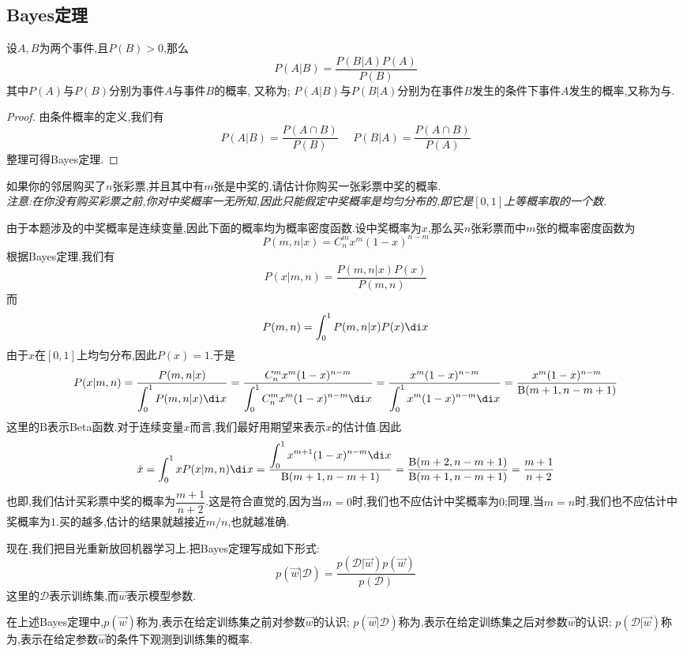 \documentclass{ctexart}
\begin{document}
\subsection{Bayes定理}
\begin{theorem}[Bayes定理]
    设$A,B$为两个事件,且$P(B)>0$,那么
    \[P(A|B)=\dfrac{P(B|A)P(A)}{P(B)}\]
    其中$P(A)$与$P(B)$分别为事件$A$与事件$B$的概率, 又称为; $P(A|B)$与$P(B|A)$分别为在事件$B$发生的条件下事件$A$发生的概率,又称为与.
\end{theorem}
\begin{proof}
    由条件概率的定义,我们有
    \[P(A|B)=\dfrac{P(A\cap B)}{P(B)}\ \ \ \ \ \ P(B|A)=\dfrac{P(A\cap B)}{P(A)}\]
    整理可得Bayes定理.
\end{proof}
\begin{problem}
    如果你的邻居购买了$n$张彩票,并且其中有$m$张是中奖的,请估计你购买一张彩票中奖的概率.\\
    \textit{注意:在你没有购买彩票之前,你对中奖概率一无所知,因此只能假定中奖概率是均匀分布的,即它是$[0,1]$上等概率取的一个数.}
\end{problem}
\begin{solution}
    由于本题涉及的中奖概率是连续变量,因此下面的概率均为概率密度函数.设中奖概率为$x$,那么买$n$张彩票而中$m$张的概率密度函数为
    \[P(m,n|x)=C_n^mx^m(1-x)^{n-m}\]
    根据Bayes定理,我们有
    \[P(x|m,n)=\dfrac{P(m,n|x)P(x)}{P(m,n)}\]
    而
    \[P(m,n)=\int_{0}^{1}P(m,n|x)P(x)\di x\]
    由于$x$在$[0,1]$上均匀分布,因此$P(x)=1$.于是
    \[P(x|m,n)=\dfrac{P(m,n|x)}{\displaystyle\int_0^1P(m,n|x)\di x}=\dfrac{C_n^mx^m(1-x)^{n-m}}{\displaystyle\int_0^1C_n^mx^m(1-x)^{n-m}\di x}=\dfrac{x^m(1-x)^{n-m}}{\displaystyle\int_0^1x^m(1-x)^{n-m}\di x}
    =\dfrac{x^m(1-x)^{n-m}}{\text{B}(m+1,n-m+1)}\]
    这里的$\text{B}$表示Beta函数.对于连续变量$x$而言,我们最好用期望来表示$x$的估计值.因此
    \[\hat{x}=\int_0^1xP(x|m,n)\di x=\dfrac{\displaystyle\int_0^1x^{m+1}(1-x)^{n-m}\di x}{\text{B}(m+1,n-m+1)}=\dfrac{\text{B}(m+2,n-m+1)}{\text{B}(m+1,n-m+1)}=\dfrac{m+1}{n+2}\]
    也即,我们估计买彩票中奖的概率为$\dfrac{m+1}{n+2}$.这是符合直觉的,因为当$m=0$时,我们也不应估计中奖概率为$0$;同理,当$m=n$时,我们也不应估计中奖概率为$1$.买的越多,估计的结果就越接近$m/n$,也就越准确.
\end{solution}
现在,我们把目光重新放回机器学习上.把Bayes定理写成如下形式:
\[p(\vec{w}|\mathcal{D})=\dfrac{p(\mathcal{D}|\vec{w})p(\vec{w})}{p(\mathcal{D})}\]
这里的$\mathcal{D}$表示训练集,而$\vec{w}$表示模型参数.
\begin{definition}
    在上述Bayes定理中,$p(\vec{w})$称为,表示在给定训练集之前对参数$\vec{w}$的认识; $p(\vec{w}|\mathcal{D})$称为,表示在给定训练集之后对参数$\vec{w}$的认识; $p(\mathcal{D}|\vec{w})$称为,表示在给定参数$\vec{w}$的条件下观测到训练集的概率.
\end{definition}
\end{document}

